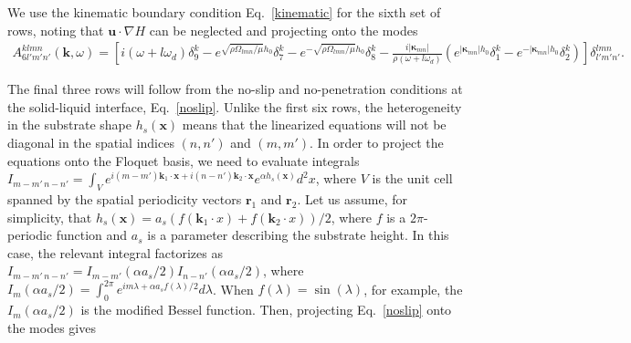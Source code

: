 \documentclass[aps,pre,amsmath,amssymb,floatfix,onecolumn,notitlepage,10pt]{revtex4-1}
\begin{document}
We use the kinematic boundary condition Eq.~\eqref{kinematic} for the sixth set of rows, noting that $\mathbf{u}\cdot\nabla H$ can be neglected and projecting onto the modes
\begin{align}
A^{klmn}_{6l'm'n'}(\mathbf{k}, \omega) = \left[i(\omega+l\omega_d)\delta^k_9 - e^{\sqrt{\rho\Omega_{lmn}/\mu}h_0}\delta^k_7 - e^{-\sqrt{\rho\Omega_{lmn}/\mu}h_0} \delta^k_8 - \frac{i|\bm{\kappa}_{mn}|}{\rho(\omega+l\omega_d)}(e^{|\bm{\kappa}_{mn}|h_0}\delta^k_1 - e^{-|\bm{\kappa}_{mn}|h_0}\delta^k_2)\right]\delta^{lmn}_{l'm'n'}. \label{lkinematic}
\end{align}

The final three rows will follow from the no-slip and no-penetration conditions at the solid-liquid interface, Eq.~\eqref{noslip}. Unlike the first six rows, the heterogeneity in the substrate shape $h_s(\mathbf{x})$ means that the linearized equations will not be diagonal in the spatial indices $(n,n')$ and $(m,m')$. In order to project the equations onto the Floquet basis, we need to evaluate integrals $I_{m-m'\, n-n'} =\int_V e^{i(m-m')\mathbf{k}_1\cdot\mathbf{x}+i(n-n')\mathbf{k}_2\cdot\mathbf{x}}e^{\alpha h_s(\mathbf{x})} d^2x$, where $V$ is the unit cell spanned by the spatial periodicity vectors $\mathbf{r}_1$ and $\mathbf{r}_2$. Let us assume, for simplicity, that $h_s(\mathbf{x}) = a_s(f(\mathbf{k}_1\cdot x)+f(\mathbf{k}_2\cdot x))/2$, where $f$ is a $2\pi$-periodic function and $a_s$ is a parameter describing the substrate height. In this case, the relevant integral factorizes as $I_{m-m'\, n-n'}  = I_{m-m'}(\alpha a_s/2)I_{n-n'}(\alpha a_s/2)$, where $I_{m}(\alpha a_s/2)=\int_0^{2\pi} e^{im\lambda+\alpha a_s f(\lambda)/2} d\lambda$. When $f(\lambda)=\sin(\lambda)$, for example, the $I_{m}(\alpha a_s/2)$ is the modified Bessel function. Then, projecting Eq.~\eqref{noslip} onto the modes gives
\end{document}
